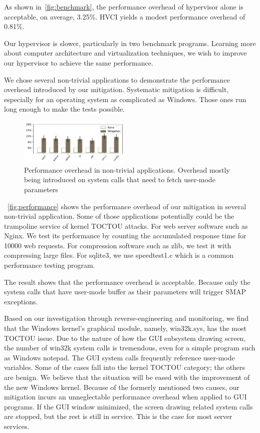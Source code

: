 As shown in~\autoref{fig:benchmark}, the performance overhead of hypervisor alone is acceptable, on average, 3.25\%. HVCI yields a modest performance overhead of 0.81\%.

Our hypervisor is slower, particularly in two benchmark programs. Learning more about computer architecture and virtualization techniques, we wish to improve our hypervisor to achieve the same performance.

We chose several non-trivial applications to demonstrate the performance overhead introduced by our mitigation. Systematic mitigation is difficult, especially for an operating system as complicated as Windows. Those ones run long enough to make the tests possible.

\begin{figure}[th]
  \includegraphics[width=0.47\textwidth]{figures/performance4}
  \centering
  \caption{Performance overhead in non-trivial applications. Overhead mostly being introduced on system calls that need to fetch user-mode parameters}
  \label{fig:performance}
\end{figure}

~\autoref{fig:performance} shows the performance overhead of our mitigation in several non-trivial application. Some of those applications potentially could be the trampoline service of kernel TOCTOU attacks.
For web server software such as Nginx. We test its performance by counting the accumulated response time for 10000 web requests. For compression software such as zlib, we test it with compressing large files. For sqlite3, we use speedtest1.c which is a common performance testing program.

The result shows that the performance overhead is acceptable. Because only the system calls that have user-mode buffer as their parameters will trigger SMAP exceptions. 



Based on our investigation through reverse-engineering and monitoring, we find that the Windows kernel's graphical module, namely, win32k.sys, has the most TOCTOU issue. Due to the nature of how the GUI subsystem drawing screen, the number of win32k system calls is tremendous, even for a simple program such as Windows notepad. The GUI system calls frequently reference user-mode variables. Some of the cases fall into the kernel TOCTOU category; the others are benign. We believe that the situation will be eased with the improvement of the new Windows kernel. Because of the formerly mentioned two causes, our mitigation incurs an unneglectable performance overhead when applied to GUI programs. If the GUI window minimized, the screen drawing related system calls are stopped, but the rest is still in service. This is the case for most server services.


